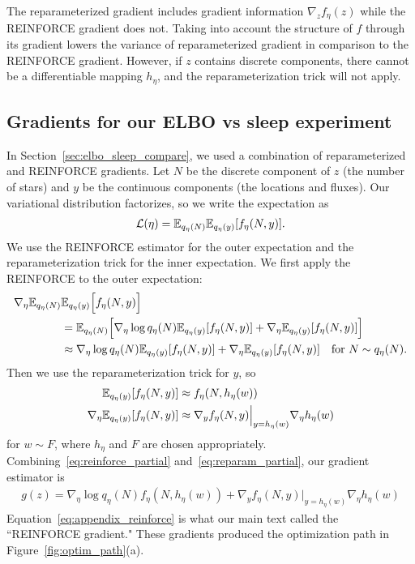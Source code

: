 The reparameterized gradient includes gradient information $\nabla_z f_\eta(z)$ while the REINFORCE gradient does not. Taking into account the structure of $f$ through its gradient lowers the variance of reparameterized gradient in comparison to the REINFORCE gradient.
However, if $z$ contains discrete components, there cannot be a differentiable mapping $h_\eta$, and the reparameterization trick will not apply.


\subsection{Gradients for our ELBO vs sleep experiment}
In Section~\ref{sec:elbo_sleep_compare}, we used a combination of reparameterized and REINFORCE gradients.
Let $N$ be the discrete component of $z$ (the number of stars) and $y$ be the continuous components (the locations and fluxes).
Our variational distribution factorizes, so we write the expectation as
\begin{align}
 \mathcal{L}(\eta) = \mathbb{E}_{q_\eta(N)}\mathbb{E}_{q_\eta(y)}[f_\eta(N, y)].
 \label{eq:elbo_factorized}
\end{align}
We use the REINFORCE estimator for the outer expectation and the reparameterization trick for the inner expectation. We first apply the REINFORCE to the outer expectation:
\begin{align}
    \nabla_\eta  \mathbb{E}_{q_\eta(N)}&\mathbb{E}_{q_\eta(y)}\Big[f_\eta(N, y)\Big] \\
    &=  \mathbb{E}_{q_\eta(N)}\Big[ \nabla_\eta \log q_\eta(N) \mathbb{E}_{q_\eta(y)}[f_\eta(N, y)] +
    \nabla_\eta \mathbb{E}_{q_\eta(y)}[f_\eta(N, y)] \Big]\\
    &\approx \nabla_\eta \log q_\eta(N) \mathbb{E}_{q_\eta(y)}[f_\eta(N, y)] +
    \nabla_\eta \mathbb{E}_{q_\eta(y)}[f_\eta(N, y)] \quad \text{for } N \sim q_\eta(N).
    \label{eq:reinforce_partial}
\end{align}
Then we use the reparameterization trick for $y$, so
\begin{align}
    \mathbb{E}_{q_\eta(y)}[f_\eta(N, y)] &\approx f_\eta(N, h_\eta(w))\\
    \nabla_\eta \mathbb{E}_{q_\eta(y)}[f_\eta(N, y)] &\approx  \nabla_y f_\eta(N, y)\Big|_{y = h_\eta(w)}
    \nabla_\eta h_\eta(w)
    \label{eq:reparam_partial}
\end{align}
for $w \sim F$, where $h_\eta$ and $F$ are chosen appropriately. Combining~\eqref{eq:reinforce_partial} and~\eqref{eq:reparam_partial}, our gradient estimator is
\begin{align}
    g(z) = \nabla_\eta \log q_\eta(N)
    f_\eta(N, h_\eta(w)) +
    \nabla_y f_\eta(N, y)\Big|_{y = h_\eta(w)}
    \nabla_\eta h_\eta(w)
    \label{eq:appendix_reinforce}
\end{align}
Equation~\ref{eq:appendix_reinforce} is what our main text called the ``REINFORCE gradient."
These gradients produced the optimization path in Figure~\ref{fig:optim_path}(a).

